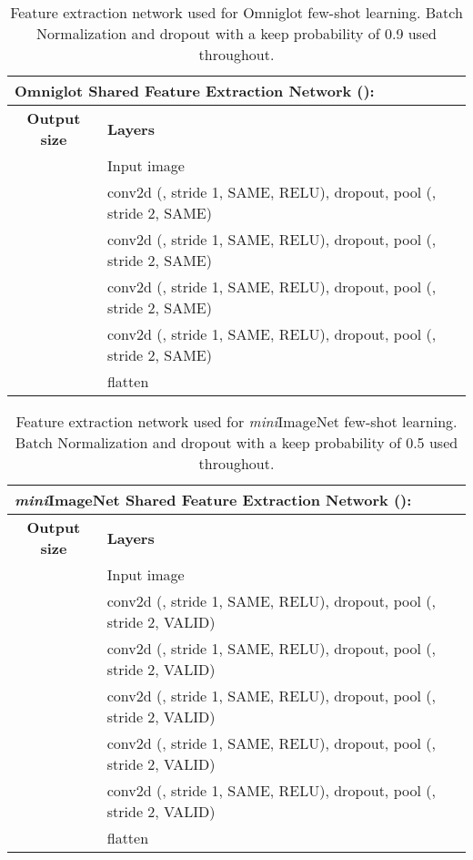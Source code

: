 \documentclass{article}
\begin{document}
\begin{table}[h]
    \caption{Feature extraction network used for Omniglot few-shot learning. Batch Normalization and dropout with a keep probability of 0.9 used throughout.}
	\centering
	\begin{tabular}{cl}
		\multicolumn{2}{l}{\textbf{Omniglot Shared Feature Extraction Network ():} } \\
		\toprule
		\textbf{Output size} & \textbf{Layers} \\
        \midrule
		 & Input image \\
		 & conv2d (, stride 1, SAME, RELU), dropout, pool (, stride 2, SAME) \\
		 & conv2d (, stride 1, SAME, RELU), dropout, pool (, stride 2, SAME) \\
		 & conv2d (, stride 1, SAME, RELU), dropout, pool (, stride 2, SAME) \\
		 & conv2d (, stride 1, SAME, RELU), dropout, pool (, stride 2, SAME) \\
         & flatten \\
        \bottomrule
	\end{tabular}
    \vspace{2mm}
	\label{table:feature_extraction_omniglot}
\end{table}

\begin{table}[h]
    \caption{Feature extraction network used for \textit{mini}ImageNet few-shot learning. Batch Normalization and dropout with a keep probability of 0.5 used throughout.}
	\centering
	\begin{tabular}{cl}
		\multicolumn{2}{l}{\textbf{\textit{mini}ImageNet Shared Feature Extraction Network ():} } \\
		\toprule
		\textbf{Output size} & \textbf{Layers} \\
        \midrule
		 & Input image \\
		 & conv2d (, stride 1, SAME, RELU), dropout, pool (, stride 2, VALID) \\
		 & conv2d (, stride 1, SAME, RELU), dropout, pool (, stride 2, VALID) \\
		 & conv2d (, stride 1, SAME, RELU), dropout, pool (, stride 2, VALID) \\
		 & conv2d (, stride 1, SAME, RELU), dropout, pool (, stride 2, VALID) \\
		 & conv2d (, stride 1, SAME, RELU), dropout, pool (, stride 2, VALID) \\
         & flatten \\
        \bottomrule
	\end{tabular}
    \vspace{2mm}
	\label{table:feature_extraction_mini_imagenet}
\end{table}
\end{document}
